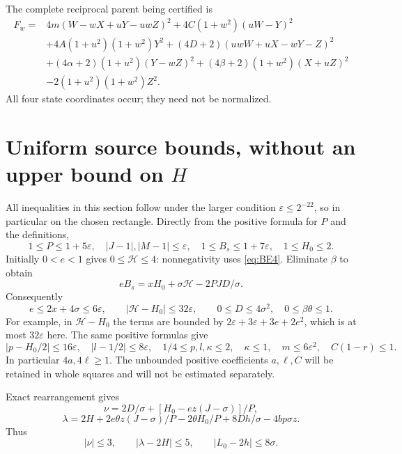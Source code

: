 \documentclass[11pt]{article}
\newcommand{\eps}{\varepsilon}
\begin{document}
The complete reciprocal parent being certified is
\[
\begin{split}
 F_w={}&4m(W-wX+uY-uwZ)^2+4C(1+w^2)(uW-Y)^2\\
 &+4A(1+u^2)(1+w^2)Y^2
 +(4D+2)(uwW+uX-wY-Z)^2\\
 &+(4\alpha+2)(1+u^2)(Y-wZ)^2
 +(4\beta+2)(1+w^2)(X+uZ)^2\\
 &-2(1+u^2)(1+w^2)Z^2.
\end{split}
\]
All four state coordinates occur; they need not be normalized.

\section{Uniform source bounds, without an upper bound on $H$}

All inequalities in this section follow under the larger condition
$\eps\le2^{-22}$, so in particular on the chosen rectangle.
Directly from the positive formula for $P$ and the definitions,
\[
 1\le P\le1+5\eps,\quad |J-1|,|M-1|\le\eps,
 \quad 1\le B_s\le1+7\eps,\quad 1\le H_0\le2.
\]
Initially $0<e<1$ gives $0\le\mathcal H\le4$: nonnegativity
uses \eqref{eq:BE4}. Eliminate $\beta$ to obtain
\[
 eB_s=xH_0+\sigma\mathcal H-2PJD/\sigma.
\]
Consequently
\begin{equation}\label{eq:basic-bounds}
 e\le2x+4\sigma\le6\eps,\qquad
 |\mathcal H-H_0|\le32\eps,\qquad
 0\le D\le4\sigma^2,\quad 0\le\beta\theta\le1.
\end{equation}
For example, in $\mathcal H-H_0$ the terms are bounded by
$2\eps+3\eps+3e+2e^2$, which is at most $32\eps$ here.
The same positive formulas give
\begin{equation}\label{eq:p-bounds}
 |p-H_0/2|\le16\eps,\quad |l-1/2|\le8\eps,
 \quad 1/4\le p,l,\kappa\le2,
 \quad \kappa\le1,\quad m\le6\eps^2,
 \quad C(1-r)\le1.
\end{equation}
In particular $4a,4\ell\ge1$. The unbounded positive coefficients
$a,\ell,C$ will be retained in whole squares and will not be
estimated separately.

Exact rearrangement gives
\[
 \nu=2D/\sigma+[H_0-ez(J-\sigma)]/P,
\]
\[
 \lambda=2H+2e\theta z(J-\sigma)/P
                  -2\theta H_0/P+8Dh/\sigma-4bp\sigma z.
\]
Thus
\begin{equation}\label{eq:lambda-bounds}
 |\nu|\le3,\qquad |\lambda-2H|\le5,
 \qquad |L_0-2h|\le8\sigma.
\end{equation}
\end{document}

